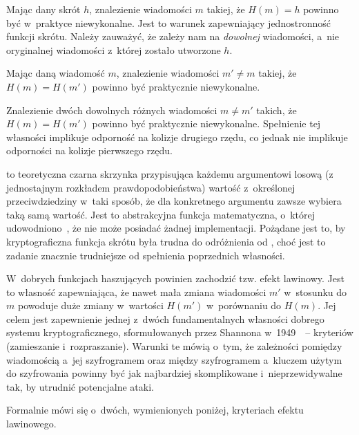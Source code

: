 \label{sec:preimage_resistance}
Mając dany skrót $h$, znalezienie wiadomości $m$ takiej, że $H(m) = h$ powinno
być w~praktyce niewykonalne. Jest to warunek zapewniający jednostronność
funkcji skrótu. Należy zauważyć, że zależy nam na \emph{dowolnej} wiadomości,
a~nie oryginalnej wiadomości z~której zostało utworzone $h$.

\label{sec:second_preimage_resistance}
Mając daną wiadomość $m$, znalezienie wiadomości $m' \neq m$ takiej, że $H(m) =
H(m')$ powinno być praktycznie niewykonalne.

\label{sec:collision_resistance}
Znalezienie dwóch dowolnych różnych wiadomości $m \neq m'$ takich, że $H(m) =
H(m')$ powinno być praktycznie niewykonalne. Spełnienie tej własności implikuje
odporność na kolizje drugiego rzędu, co jednak nie implikuje odporności na
kolizje pierwszego rzędu.

 to teoretyczna czarna skrzynka przypisująca każdemu
argumentowi losową (z jednostajnym rozkładem prawdopodobieństwa) wartość
z~określonej przeciwdziedziny w~taki sposób, że dla konkretnego argumentu
zawsze wybiera taką samą wartość. Jest to abstrakcyjna funkcja matematyczna,
o~której udowodniono~\cite{random_oracle}, że nie może posiadać żadnej
implementacji. Pożądane jest to, by kryptograficzna funkcja skrótu była trudna
do odróżnienia od , choć jest to zadanie znacznie trudniejsze
od spełnienia poprzednich własności.

\label{sec:avalance_effect}
W~dobrych funkcjach haszujących powinien zachodzić tzw. efekt lawinowy. Jest to
własność zapewniająca, że nawet mała zmiana wiadomości $m'$ w~stosunku do $m$
powoduje duże zmiany w~wartości $H(m')$ w~porównaniu do $H(m)$. Jej celem jest
zapewnienie jednej z~dwóch fundamentalnych własności dobrego systemu
kryptograficznego, sformułowanych przez Shannona
w~1949~\cite{confusion_diffusion}~-- kryteriów 
(zamieszanie i~rozpraszanie). Warunki te mówią o~tym, że zależności pomiędzy
wiadomością a~jej szyfrogramem oraz między szyfrogramem a~kluczem użytym do
szyfrowania powinny być jak najbardziej skomplikowane i~nieprzewidywalne tak,
by utrudnić potencjalne ataki.

\noindent Formalnie mówi się o~dwóch, wymienionych poniżej, kryteriach efektu
lawinowego.

